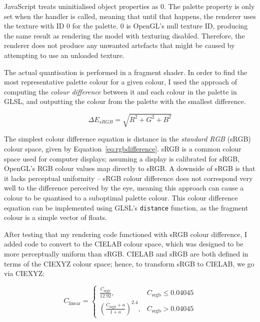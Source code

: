 \documentclass[12pt,twoside,notitlepage]{report}
\begin{document}
JavaScript treats uninitialised object properties as 0. The palette property is only set when the handler is called, meaning that until that happens, the renderer uses the texture with ID 0 for the palette. 0 is OpenGL's null texture ID, producing the same result as rendering the model with texturing disabled. Therefore, the renderer does not produce any unwanted artefacts that might be caused by attempting to use an unloaded texture.

The actual quantisation is performed in a fragment shader. In order to find the most representative palette colour for a given colour, I used the approach of computing the \textit{colour difference} between it and each colour in the palette in GLSL, and outputting the colour from the palette with the smallest difference.

\begin{equation}
\label{eq:rgbdifference}
\Delta E_{sRGB} = \sqrt{R^2 + G^2 + B^2}
\end{equation}

The simplest colour difference equation is distance in the \textit{standard RGB} (sRGB) colour space, given by Equation~\ref{eq:rgbdifference}. sRGB is a common colour space used for computer displays; assuming a display is calibrated for sRGB, OpenGL's RGB colour values map directly to sRGB. A downside of sRGB is that it lacks perceptual uniformity -- sRGB colour difference does not correspond very well to the difference perceived by the eye, meaning this approach can cause a colour to be quantised to a suboptimal palette colour. This colour difference equation can be implemented using GLSL's \verb|distance| function, as the fragment colour is a simple vector of floats.

After testing that my rendering code functioned with sRGB colour difference, I added code to convert to the CIELAB colour space, which was designed to be more perceptually uniform than sRGB. CIELAB and sRGB are both defined in terms of the CIEXYZ colour space; hence, to transform sRGB to CIELAB, we go via CIEXYZ:

\begin{equation}C_\mathrm{linear}=
\begin{cases}\frac{C_\mathrm{srgb}}{12.92}, & C_\mathrm{srgb}\le0.04045\\
\left(\frac{C_\mathrm{srgb}+a}{1+a}\right)^{2.4}, & C_\mathrm{srgb}>0.04045
\end{cases}\end{equation}
\end{document}
